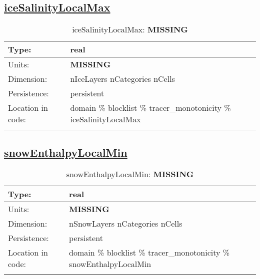 \subsection[iceSalinityLocalMax]{\hyperref[sec:var_tab_tracer_monotonicity]{iceSalinityLocalMax}}
\label{subsec:var_sec_tracer_monotonicity_iceSalinityLocalMax}
\begin{center}
\begin{longtable}{| p{2.0in} | p{4.0in} |}
        \hline 
        Type: & real \\
        \hline 
        Units: & {\bf \color{red} MISSING} \\
        \hline 
        Dimension: & nIceLayers nCategories nCells \\
        \hline 
        Persistence: & persistent \\
        \hline 
         Location in code: & domain \% blocklist \% tracer\_monotonicity \% iceSalinityLocalMax \\
         \hline 
    \caption{iceSalinityLocalMax: {\bf \color{red} MISSING}}
\end{longtable}
\end{center}
\subsection[snowEnthalpyLocalMin]{\hyperref[sec:var_tab_tracer_monotonicity]{snowEnthalpyLocalMin}}
\label{subsec:var_sec_tracer_monotonicity_snowEnthalpyLocalMin}
\begin{center}
\begin{longtable}{| p{2.0in} | p{4.0in} |}
        \hline 
        Type: & real \\
        \hline 
        Units: & {\bf \color{red} MISSING} \\
        \hline 
        Dimension: & nSnowLayers nCategories nCells \\
        \hline 
        Persistence: & persistent \\
        \hline 
         Location in code: & domain \% blocklist \% tracer\_monotonicity \% snowEnthalpyLocalMin \\
         \hline 
    \caption{snowEnthalpyLocalMin: {\bf \color{red} MISSING}}
\end{longtable}
\end{center}
